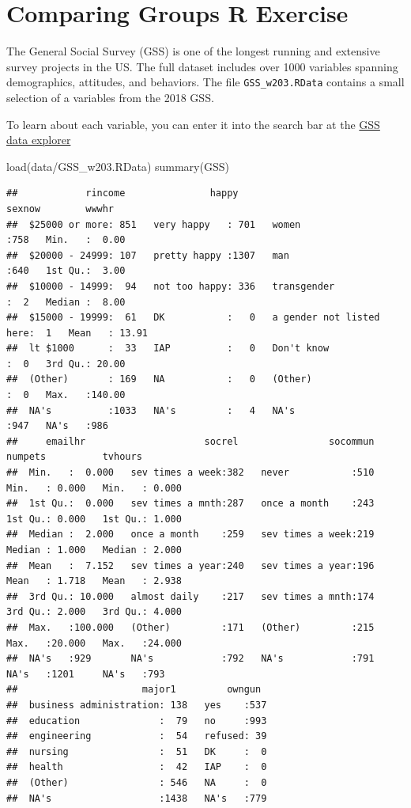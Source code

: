 \documentclass[
]{book}
\newenvironment{Shaded}{\begin{snugshade}}{\end{snugshade}}
\newcommand{\FunctionTok}[1]{\textcolor[rgb]{0.00,0.00,0.00}{#1}}
\newcommand{\NormalTok}[1]{#1}
\newcommand{\StringTok}[1]{\textcolor[rgb]{0.31,0.60,0.02}{#1}}
\theoremstyle{definition}
\theoremstyle{definition}
\theoremstyle{definition}
\theoremstyle{definition}
\theoremstyle{remark}
\begin{document}
\hypertarget{comparing-groups-r-exercise}{%
\section{Comparing Groups R Exercise}\label{comparing-groups-r-exercise}}

The General Social Survey (GSS) is one of the longest running and extensive survey projects in the US. The full dataset includes over 1000 variables spanning demographics, attitudes, and behaviors. The file \texttt{GSS\_w203.RData} contains a small selection of a variables from the 2018 GSS.

To learn about each variable, you can enter it into the search bar at the \href{https://gssdataexplorer.norc.org/variables/vfilter}{GSS data explorer}

\begin{Shaded}
\begin{Highlighting}[]
\FunctionTok{load}\NormalTok{(}\StringTok{\textquotesingle{}data/GSS\_w203.RData\textquotesingle{}}\NormalTok{)}
\FunctionTok{summary}\NormalTok{(GSS)}
\end{Highlighting}
\end{Shaded}

\begin{verbatim}
##            rincome               happy                           sexnow        wwwhr       
##  $25000 or more: 851   very happy   : 701   women                   :758   Min.   :  0.00  
##  $20000 - 24999: 107   pretty happy :1307   man                     :640   1st Qu.:  3.00  
##  $10000 - 14999:  94   not too happy: 336   transgender             :  2   Median :  8.00  
##  $15000 - 19999:  61   DK           :   0   a gender not listed here:  1   Mean   : 13.91  
##  lt $1000      :  33   IAP          :   0   Don't know              :  0   3rd Qu.: 20.00  
##  (Other)       : 169   NA           :   0   (Other)                 :  0   Max.   :140.00  
##  NA's          :1033   NA's         :   4   NA's                    :947   NA's   :986     
##     emailhr                     socrel                socommun      numpets          tvhours      
##  Min.   :  0.000   sev times a week:382   never           :510   Min.   : 0.000   Min.   : 0.000  
##  1st Qu.:  0.000   sev times a mnth:287   once a month    :243   1st Qu.: 0.000   1st Qu.: 1.000  
##  Median :  2.000   once a month    :259   sev times a week:219   Median : 1.000   Median : 2.000  
##  Mean   :  7.152   sev times a year:240   sev times a year:196   Mean   : 1.718   Mean   : 2.938  
##  3rd Qu.: 10.000   almost daily    :217   sev times a mnth:174   3rd Qu.: 2.000   3rd Qu.: 4.000  
##  Max.   :100.000   (Other)         :171   (Other)         :215   Max.   :20.000   Max.   :24.000  
##  NA's   :929       NA's            :792   NA's            :791   NA's   :1201     NA's   :793     
##                      major1         owngun   
##  business administration: 138   yes    :537  
##  education              :  79   no     :993  
##  engineering            :  54   refused: 39  
##  nursing                :  51   DK     :  0  
##  health                 :  42   IAP    :  0  
##  (Other)                : 546   NA     :  0  
##  NA's                   :1438   NA's   :779
\end{verbatim}
\end{document}
